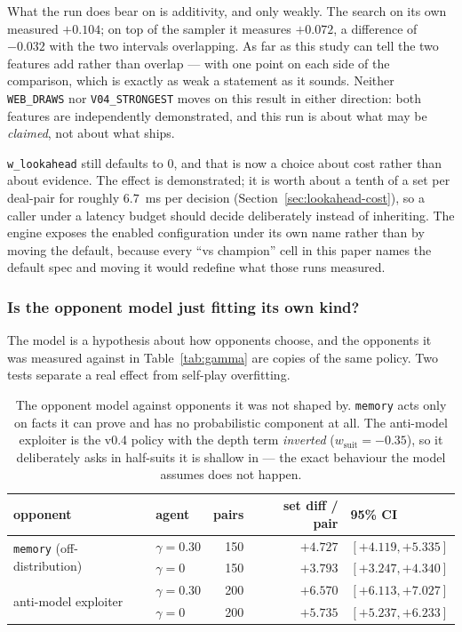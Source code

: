 \documentclass[11pt,letterpaper]{article}
\begin{document}
What the run does bear on is additivity, and only weakly. The search on its own
measured $+0.104$; on top of the sampler it measures $+0.072$, a difference of
$-0.032$ with the two intervals overlapping. As far as this study can tell the
two features add rather than overlap --- with one point on each side of the
comparison, which is exactly as weak a statement as it sounds. Neither
\texttt{WEB\_DRAWS} nor \texttt{V04\_STRONGEST} moves on this result in either
direction: both features are independently demonstrated, and this run is about
what may be \emph{claimed}, not about what ships.

\texttt{w\_lookahead} still defaults to $0$, and that is now a choice about cost
rather than about evidence. The effect is demonstrated; it is worth about a tenth
of a set per deal-pair for roughly $6.7$~ms per decision
(Section~\ref{sec:lookahead-cost}), so a caller under a latency budget should
decide deliberately instead of inheriting. The engine exposes the enabled
configuration under its own name rather than by moving the default, because every
``vs champion'' cell in this paper names the default spec and moving it would
redefine what those runs measured.

\subsubsection{Is the opponent model just fitting its own kind?}
\label{sec:res-robust}

The model is a hypothesis about how opponents choose, and the opponents it was
measured against in Table~\ref{tab:gamma} are copies of the same policy. Two
tests separate a real effect from self-play overfitting.

\begin{table}[t]
\centering
\small
\begin{tabular}{llrrl}
\toprule
opponent & agent & pairs & set diff / pair & 95\% CI \\
\midrule
\multirow{2}{*}{\texttt{memory} (off-distribution)}
  & $\gamma = 0.30$ & 150 & $+4.727$ & $[+4.119, +5.335]$ \\
  & $\gamma = 0$    & 150 & $+3.793$ & $[+3.247, +4.340]$ \\
\midrule
\multirow{2}{*}{anti-model exploiter}
  & $\gamma = 0.30$ & 200 & $+6.570$ & $[+6.113, +7.027]$ \\
  & $\gamma = 0$    & 200 & $+5.735$ & $[+5.237, +6.233]$ \\
\bottomrule
\end{tabular}
\caption{The opponent model against opponents it was not shaped by.
\texttt{memory} acts only on facts it can prove and has no probabilistic
component at all. The anti-model exploiter is the v0.4 policy with the depth
term \emph{inverted} ($w_{\mathrm{suit}} = -0.35$), so it deliberately asks in
half-suits it is shallow in --- the exact behaviour the model assumes does not
happen.}
\label{tab:robust}
\end{table}
\end{document}
